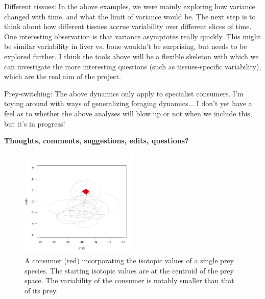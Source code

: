 \documentclass[11pt]{article}
\begin{document}
Different tissues: In the above examples, we were mainly exploring how variance changed with time, and what the limit of variance would be.
The next step is to think about how different tissues accrue variability over different slices of time.
One interesting observation is that variance asymptotes really quickly.
This might be similar variability in liver vs. bone wouldn't be surprising, but needs to be explored further.
I think the tools above will be a flexible skeleton with which we can investigate the more interesting questions (such as tissues-specific variability), which are the real aim of the project.

Prey-switching: The above dynamics only apply to specialist consumers. I'm toying around with ways of generalizing foraging dynamics... I don't yet have a feel as to whether the above analyses will blow up or not when we include this, but it's in progress!

{\bf Thoughts, comments, suggestions, edits, questions?}


\begin{figure}[h!]
   \centering
   \includegraphics[width=0.5\textwidth]{fig_bivariate.png}
      \caption{
      A consumer (red) incorporating the isotopic values of a single prey species. The starting isotopic values are at the centroid of the prey space. The variability of the consumer is notably smaller than that of its prey.
      }
      \label{fig_bivariate}
\end{figure}
\end{document}

